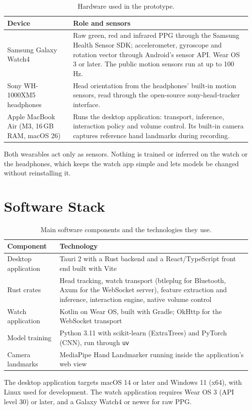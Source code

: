 \begin{table}[htbp]
\centering
\caption{Hardware used in the prototype.}\label{tab:hardware}
\begin{tabularx}{\linewidth}{@{}l>{\raggedright\arraybackslash}X@{}}
\toprule
\textbf{Device} & \textbf{Role and sensors} \\
\midrule
Samsung Galaxy Watch4 & Raw green, red and infrared PPG through the Samsung Health Sensor SDK; accelerometer, gyroscope and rotation vector through Android's sensor API. Wear OS 3 or later. The public motion sensors run at up to 100\,Hz. \\
Sony WH-1000XM5 headphones & Head orientation from the headphones' built-in motion sensors, read through the open-source sony-head-tracker interface. \\
Apple MacBook Air (M3, 16\,GB RAM, macOS 26) & Runs the desktop application: transport, inference, interaction policy and volume control. Its built-in camera captures reference hand landmarks during recording. \\
\bottomrule
\end{tabularx}
\end{table}

Both wearables act only as sensors. Nothing is trained or inferred on the watch or the headphones, which keeps the watch app simple and lets models be changed without reinstalling it.

\section{Software Stack}

\begin{table}[htbp]
\centering
\caption{Main software components and the technologies they use.}\label{tab:stack}
\begin{tabularx}{\linewidth}{@{}l>{\raggedright\arraybackslash}X@{}}
\toprule
\textbf{Component} & \textbf{Technology} \\
\midrule
Desktop application & Tauri 2 with a Rust backend and a React/TypeScript front end built with Vite \\
Rust crates & Head tracking, watch transport (btleplug for Bluetooth, Axum for the WebSocket server), feature extraction and inference, interaction engine, native volume control \\
Watch application & Kotlin on Wear OS, built with Gradle; OkHttp for the WebSocket transport \\
Model training & Python 3.11 with scikit-learn (ExtraTrees) and PyTorch (CNN), run through \texttt{uv} \\
Camera landmarks & MediaPipe Hand Landmarker running inside the application's web view \\
\bottomrule
\end{tabularx}
\end{table}

The desktop application targets macOS 14 or later and Windows 11 (x64), with Linux used for development. The watch application requires Wear OS 3 (API level 30) or later, and a Galaxy Watch4 or newer for raw PPG.
